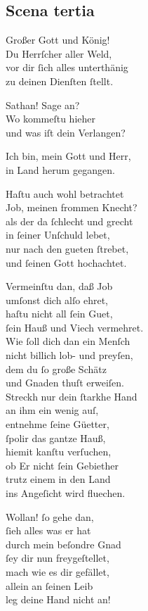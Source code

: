 \documentclass{ees}
\newenvironment{lyrics}[1]{%
  \subsection{#1}\nopagebreak%
  \begin{lyricslist}%
  \let\voice\item%
}{%
  \end{lyricslist}%
}
\begin{document}
\begin{lyrics}{Scena tertia}
  \voice[Die Kinder Gottes]\enlargethispage\baselineskip
  Großer Gott und König!\\
  Du Herrſcher aller Weld,\\
  vor dir ſich alles unterthänig\\
  zu deinen Dienſten ſtellt.

  \voice[Schöpffer]
  Sathan! Sage an?\\
  Wo kommeſtu hieher\\
  und was iſt dein Verlangen?

  \voice[Leviathan]
  Ich bin, mein Gott und Herr,\\
  in Land herum gegangen.

  \voice[Schöpffer]
  Haſtu auch wohl betrachtet\\
  Job, meinen frommen Knecht?\\
  als der da ſchlecht und grecht\\
  in ſeiner Unſchuld lebet,\\
  nur nach den gueten ſtrebet,\\
  und ſeinen Gott hochachtet.

  \voice[Leviathan]
  Vermeinſtu dan, daß Job\\
  umſonst dich alſo ehret,\\
  haſtu nicht all ſein Guet,\\
  ſein Hauß und Viech vermehret.\\
  Wie ſoll dich dan ein Menſch\\
  nicht billich lob- und preyſen,\\
  dem du ſo große Schätz\\
  und Gnaden thuſt erweiſen.\\
  Streckh nur dein ſtarkhe Hand\\
  an ihm ein wenig auſ,\\
  entnehme ſeine Güetter,\\
  ſpolir das gantze Hauß,\\
  hiemit kanſtu verſuchen,\\
  ob Er nicht ſein Gebiether\\
  trutz einem in den Land\\
  ins Angeſicht wird fluechen.

  \voice[Schöpffer]
  Wollan! ſo gehe dan,\\
  ſieh alles was er hat\\
  durch mein beſondre Gnad\\
  ſey dir nun freygeſtellet,\\
  mach wie es dir gefället,\\
  allein an ſeinen Leib\\
  leg deine Hand nicht an!
\end{lyrics}
\end{document}

